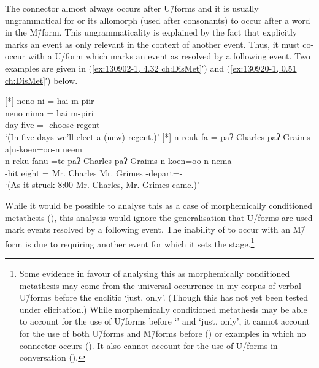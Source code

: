 The connector  almost always occurs after U\=/forms
and it is usually ungrammatical for  or its allomorph  (used after consonants)
to occur after a word in the M\=/form.
This ungrammaticality is explained by the fact that 
explicitly marks an event as only relevant in the context of another event.
Thus, it must co-occur with a U\=/form which
marks an event as resolved by a following event.
Two examples are given in (\ref{ex:130902-1, 4.32 ch:DisMet}′)
and (\ref{ex:130920-1, 0.51 ch:DisMet}′) below.

\begin{exe}
	{\glll
								neno ni = hai m-piir \\
								neno nima = hai m-piri \\
								day five{\tbrM} {=\tbr{\te}} {\hai} \m-choose{\M} regent\\
					\glt	`(In five days we'll elect a (new) regent.)' }
	{\glll
								n-reuk fa = paʔ Charles paʔ Graims \hspace{34mm} a|n-koen=oo-n neem\\
								n-reku fanu =te paʔ Charles paʔ Graims {} {\a}n-koen=oo-n nema\\
								\n-hit eight{\tbrM} {=\tbr{\te}} Mr. Charles Mr. Grimes {} \a\n-depart={\oo-\N} {\nema}\\
					\glt	`(As it struck 8:00 Mr. Charles, Mr. Grimes came.)' }
\end{exe}

While it would be possible to analyse this as a case of
morphemically conditioned metathesis (),
this analysis would ignore the generalisation that
U\=/forms are used mark events resolved by a following event.
The inability of  to occur with an M\=/form is due to 
requiring another event for which it sets the stage.\footnote{
		Some evidence in favour of analysing this as morphemically conditioned
		metathesis may come from the universal occurrence in my corpus of verbal U\=/forms
		before the enclitic  `just, only'.
		(Though this has not yet been tested under elicitation.)
		While morphemically conditioned metathesis may be able
		to account for the use of U\=/forms before  `{\te}'
		and  `just, only', it cannot account for the use of
		both U\=/forms and M\=/forms before  () or
		examples in which no connector occurs ().
		It also cannot account for the use of U\=/forms in conversation ().}

